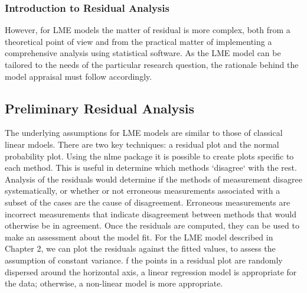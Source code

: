 \documentclass[12pt, a4paper]{report}
\theoremstyle{plain}
\theoremstyle{definition}
\theoremstyle{remark}
\begin{document}
	
	\subsubsection{Introduction to Residual Analysis}

	
	However, for LME models the matter of residual is more complex, both from a theoretical point of view and from the practical matter of implementing a comprehensive analysis using statistical software. As the LME model can be tailored to the needs of the particular research question, the rationale behind the model appraisal must follow accordingly.
	
	
	
	\subsection*{Preliminary Residual Analysis }
	
	The underlying assumptions for LME models are similar to those of classical linear mdoels. There are two key techniques: a residual plot and the normal probability plot. Using the nlme package it is possible to create plots specific to each method. This is useful in determine which methods `disagree` with the rest.
	Analysis of the residuals would determine if the methods of measurement disagree systematically, or whether or not erroneous measurements associated with a subset of the cases are the cause of disagreement.
	Erroneous measurements are incorrect measurements that indicate disagreement between methods that would otherwise be in agreement.
	Once the residuals are computed, they can be used to make an assessment about the model fit. For the LME model described in Chapter 2, we can plot the residuals against the fitted values, to assess the assumption of constant variance. f the points in a residual plot are randomly dispersed around the horizontal axis, a linear regression model is appropriate for the data; otherwise, a non-linear model is more appropriate.
	
\end{document}
